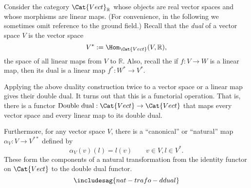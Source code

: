 \begin{example}
Consider the category $\Cat{Vect}_{\mathbb{R}}$ whose objects are real vector spaces and whose morphisms are linear maps. (For convenience, in the following we sometimes omit reference to the ground field.) Recall that the \emph{dual} of a vector space $V$ is the vector space
$$
V^* := \Hom_{\Cat{Vect}}(V, \mathbb{R}), 
$$
 the space of all linear maps from $V$ to $\mathbb{R}$. Also, recall the if $f: V \rightarrow W$ is a linear map, then its dual is a linear map $f^*: W^* \rightarrow V^*$. 

Applying the above duality construction twice to a vector space or a linear map gives their double dual. It turns out that this is a functorial operation. That is, there is a functor $\text{Double dual}: \Cat{Vect} \rightarrow \Cat{Vect}$ that maps every vector space and every linear map to its double dual. 

Furthermore, for any vector space $V$, there is a ``canonical'' or ``natural'' map $\alpha_V : V \rightarrow V^{**}$ defined by 
$$
\alpha_V(v)(l) = l(v) \quad \quad  v \in V, l \in V^*. 
$$
These form the components of a natural transformation from the identity functor on $\Cat{Vect}$ to the double dual functor. 
\begin{equation}
\includesag{nat-trafo-ddual}
\end{equation}



\end{example}



